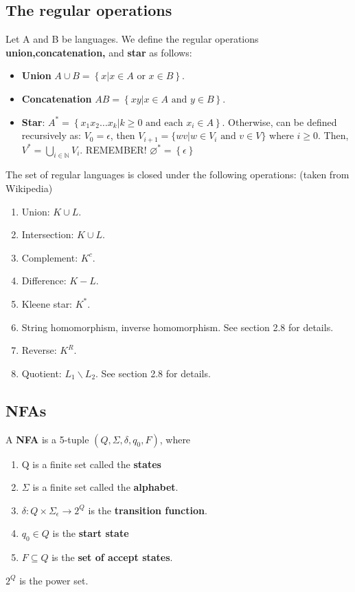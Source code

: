 \documentclass[a4paper]{article}
\begin{document}
\subsection{The regular operations} %
\label{sub:The regular operations}
Let A and B be languages. We define the regular operations {\bf union,concatenation,} and {\bf star} as follows:
\begin{itemize}
  \item {\bf Union} $A \cup B= \left\{ x|x \in A \text{ or } x \in B \right\}$. 
  \item {\bf Concatenation} $AB=\left\{ xy|x \in A \text{ and } y \in B \right\}$.
  \item {\bf Star}: $A^*=\left\{ x_1x_2\dots x_k| k \geq 0 \text{ and each }x_i \in A \right\}$. Otherwise, can be defined
    recursively as: $V_0={\epsilon}$, then $V_{i+1}=\{wv| w \in V_i \text{ and } v \in V\}$ where $i \geq0$. Then,
    $V^*=\bigcup_{i\in \mathbb{N}} V_i$. REMEMBER! $\varnothing^*=\left\{ \epsilon \right\}$
\end{itemize}
The set of regular languages is closed under the following operations: (taken from Wikipedia)
\begin{enumerate}
  \item Union: $K \cup L$.
  \item Intersection: $K \cup L$.
  \item Complement: $K^c$.
  \item Difference: $K-L$.
  \item Kleene star: $K^*$.
  \item String homomorphism, inverse homomorphism. See section 2.8 for details.
  \item Reverse: $K^R$.
  \item Quotient: $L_1 \backslash L_2$. See section 2.8 for details.
\end{enumerate}
\subsection{NFAs} %
\label{sub:NFAs}
A {\bf NFA} is a 5-tuple $(Q,\Sigma, \delta, q_0, F)$, where

\begin{enumerate}
  \item Q is a finite set called the {\bf states}
  \item $\Sigma$ is a finite set called the {\bf alphabet}.
  \item $\delta:Q \times \Sigma_{\epsilon} \rightarrow 2^Q$ is the {\bf transition function}.
  \item $q_0 \in Q$ is the {\bf start state}
  \item $F \subseteq Q$ is the {\bf set of accept states}.
\end{enumerate}
$2^Q$ is the power set.
\end{document}
